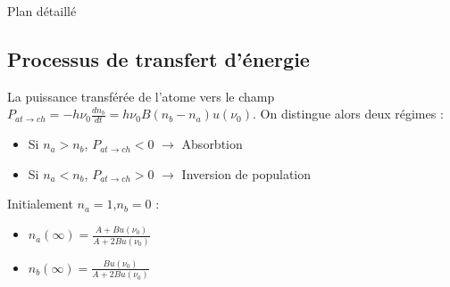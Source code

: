 \begin{reportBlock}{Plan détaillé}
\subsection{Processus de transfert d'énergie}
La puissance transférée de l'atome vers le champ $P_{at\rightarrow ch}=-h\nu_0\frac{dn_b}{dt} = h\nu_0B(n_b-n_a)u(\nu_0)$. On distingue alors deux régimes : 
\begin{itemize}
    \item Si $n_a>n_b$, $P_{at\rightarrow ch}<0$ $\longrightarrow$ Absorbtion
    \item Si $n_a<n_b$, $P_{at\rightarrow ch}>0$ $\longrightarrow$ Inversion de population
\end{itemize}

Initialement $n_a=1$,$n_b=0$ : 
\begin{itemize}
    \item $n_a(\infty) = \frac{A + Bu(\nu_0)}{A + 2Bu(\nu_0)}$
    \item $n_b(\infty) = \frac{Bu(\nu_0)}{A + 2Bu(\nu_0)}$
\end{itemize}
\end{reportBlock}



